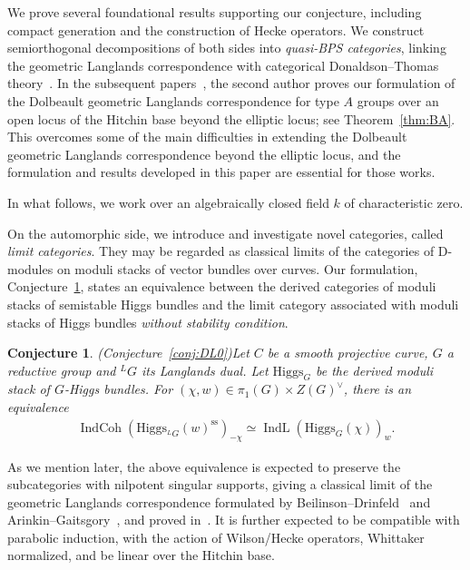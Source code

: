 \documentclass [11pt,oneside,a4paper,mathscr]{amsart}
\newtheorem{conj}[thm]{Conjecture}
\theoremstyle{definition}
\newcommand{\IndCoh}{\operatorname{IndCoh}}
\newcommand{\IndL}{\operatorname{IndL}}
\newcommand{\Hig}{\mathrm{Higgs}}
\begin{document}
We prove several foundational results supporting our conjecture, including compact generation and the construction of Hecke operators. We construct semiorthogonal decompositions of both sides into \textit{quasi-BPS categories}, linking the geometric Langlands correspondence with categorical Donaldson--Thomas theory~\cite{T}. 
In the subsequent papers~\cite{TodaGL2, TodaA}, the second author proves our formulation of the Dolbeault geometric Langlands correspondence for type $A$ groups over an open locus of the Hitchin base beyond the elliptic locus; see Theorem~\ref{thm:BA}. This overcomes some of the main difficulties in extending the Dolbeault geometric Langlands correspondence beyond the elliptic locus, and the formulation and results developed in this paper are essential for those works.

In what follows, we work over an algebraically closed field $k$ of characteristic zero.

On the automorphic side, we introduce and investigate novel categories, called \textit{limit categories}. They may be regarded as classical limits of the categories of D-modules on moduli stacks of vector bundles over curves. 
Our formulation, Conjecture~\ref{conj:intro:higgs}, states an equivalence between the derived categories of moduli stacks of semistable Higgs bundles and the limit category associated with moduli stacks of Higgs bundles \textit{without stability condition}.
\begin{conj}\emph{(Conjecture~\ref{conj:DL0})}\label{conj:intro:higgs}
    Let $C$ be a smooth projective curve, $G$ a reductive group and $^{L}G$ its Langlands dual. 
    Let $\Hig_G$ be the derived moduli stack of $G$-Higgs bundles. 
    For $(\chi, w) \in \pi_1(G) \times Z(G)^{\vee}$, there is an equivalence
    \begin{align}\label{intro:cohL}
        \IndCoh(\Hig_{^{L}G}(w)^{\mathrm{ss}})_{-\chi}\simeq \IndL(\Hig_{G}(\chi))_w.
    \end{align}
\end{conj}

As we mention later, the above equivalence is expected to preserve the subcategories with nilpotent singular supports, giving a classical limit of the geometric Langlands correspondence formulated by Beilinson--Drinfeld~\cite{BD0} and Arinkin--Gaitsgory~\cite{AG}, and proved in~\cite{GLC1, GLC2, GLC3, GLC4, GLC5}. It is further expected to be compatible with parabolic induction, with the action of Wilson/Hecke operators, Whittaker normalized, and be linear over the Hitchin base. 
\end{document}
